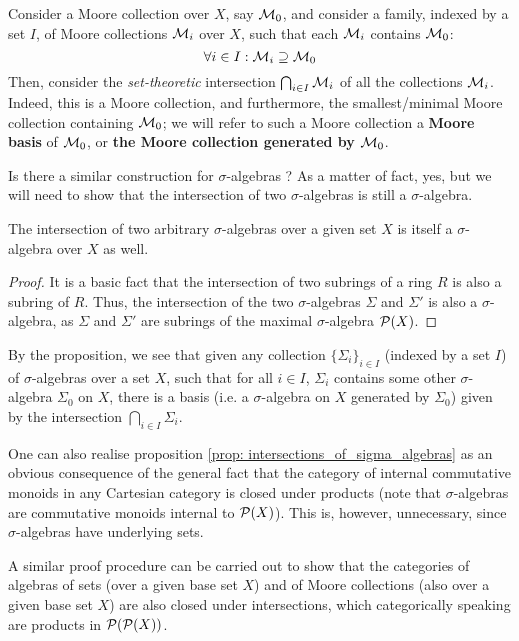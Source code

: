         \begin{remark}
            Consider a Moore collection over $X$, say $\mathcal{M}_0$, and consider a family, indexed by a set $I$, of Moore collections $\mathcal{M}_i$ over $X$, such that each $\mathcal{M}_i$ contains $\mathcal{M}_0$:
                $$\forall i \in I: \mathcal{M}_i \supseteq \mathcal{M}_0$$
            Then, consider the \textit{set-theoretic} intersection $\bigcap_{i \in I} \mathcal{M}_i$ of all the collections $\mathcal{M}_i$. Indeed, this is a Moore collection, and furthermore, the smallest/minimal Moore collection containing $\mathcal{M}_0$; we will refer to such a Moore collection a \textbf{Moore basis} of $\mathcal{M}_0$, or \textbf{the Moore collection generated by $\mathcal{M}_0$}. 
            
            Is there a similar construction for $\sigma$-algebras ? As a matter of fact, yes, but we will need to show that the intersection of two $\sigma$-algebras is still a $\sigma$-algebra. 
        \end{remark}
        \begin{proposition} \label{prop: intersections_of_sigma_algebras}
            The intersection of two arbitrary $\sigma$-algebras over a given set $X$ is itself a $\sigma$-algebra over $X$ as well. 
        \end{proposition}
            \begin{proof}
                It is a basic fact that the intersection of two subrings of a ring $R$ is also a subring of $R$. Thus, the intersection of the two $\sigma$-algebras $\Sigma$ and $\Sigma'$ is also a $\sigma$-algebra, as $\Sigma$ and $\Sigma'$ are subrings of the maximal $\sigma$-algebra $\mathcal{P}(X)$.
            \end{proof}
        \begin{corollary}
            By the proposition, we see that given any collection $\{\Sigma_i\}_{i \in I}$ (indexed by a set $I$) of $\sigma$-algebras over a set $X$, such that for all $i \in I$, $\Sigma_i$ contains some other $\sigma$-algebra $\Sigma_0$ on $X$, there is a basis (i.e. a $\sigma$-algebra on $X$ generated by $\Sigma_0$) given by the intersection $\bigcap_{i \in I} \Sigma_i$.
        \end{corollary}
        \begin{remark}
           One can also realise proposition \ref{prop: intersections_of_sigma_algebras} as an obvious consequence of the general fact that the category of internal commutative monoids in any Cartesian category is closed under products (note that $\sigma$-algebras are commutative monoids internal to $\mathcal{P}(X)$). This is, however, unnecessary, since $\sigma$-algebras have underlying sets.
           
           A similar proof procedure can be carried out to show that the categories of algebras of sets (over a given base set $X$) and of Moore collections (also over a given base set $X$) are also closed under intersections, which categorically speaking are products in $\mathcal{P}(\mathcal{P}(X))$.
        \end{remark}
        
